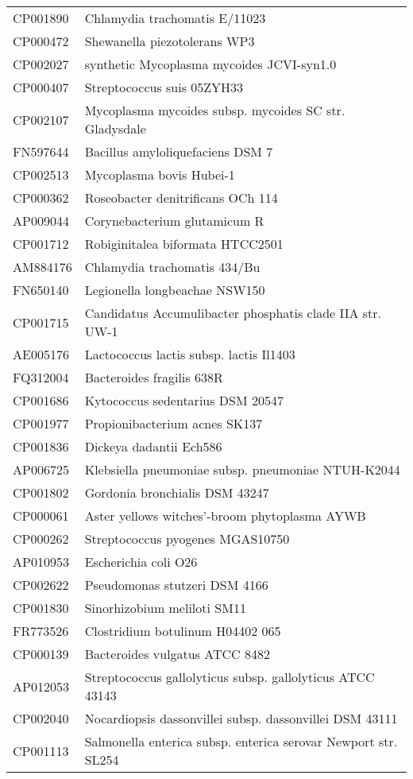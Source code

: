 \begin{longtable}{ll}
CP001890 & Chlamydia trachomatis E/11023\\
CP000472 & Shewanella piezotolerans WP3\\
CP002027 & synthetic Mycoplasma mycoides JCVI-syn1.0\\
CP000407 & Streptococcus suis 05ZYH33\\
CP002107 & Mycoplasma mycoides subsp. mycoides SC str. Gladysdale\\
FN597644 & Bacillus amyloliquefaciens DSM 7\\
CP002513 & Mycoplasma bovis Hubei-1\\
CP000362 & Roseobacter denitrificans OCh 114\\
AP009044 & Corynebacterium glutamicum R\\
CP001712 & Robiginitalea biformata HTCC2501\\
AM884176 & Chlamydia trachomatis 434/Bu\\
FN650140 & Legionella longbeachae NSW150\\
CP001715 & Candidatus Accumulibacter phosphatis clade IIA str. UW-1\\
AE005176 & Lactococcus lactis subsp. lactis Il1403\\
FQ312004 & Bacteroides fragilis 638R\\
CP001686 & Kytococcus sedentarius DSM 20547\\
CP001977 & Propionibacterium acnes SK137\\
CP001836 & Dickeya dadantii Ech586\\
AP006725 & Klebsiella pneumoniae subsp. pneumoniae NTUH-K2044\\
CP001802 & Gordonia bronchialis DSM 43247\\
CP000061 & Aster yellows witches'-broom phytoplasma AYWB\\
CP000262 & Streptococcus pyogenes MGAS10750\\
AP010953 & Escherichia coli O26\\
CP002622 & Pseudomonas stutzeri DSM 4166\\
CP001830 & Sinorhizobium meliloti SM11\\
FR773526 & Clostridium botulinum H04402 065\\
CP000139 & Bacteroides vulgatus ATCC 8482\\
AP012053 & Streptococcus gallolyticus subsp. gallolyticus ATCC 43143\\
CP002040 & Nocardiopsis dassonvillei subsp. dassonvillei DSM 43111\\
CP001113 & Salmonella enterica subsp. enterica serovar Newport str. SL254\\

\end{longtable}

